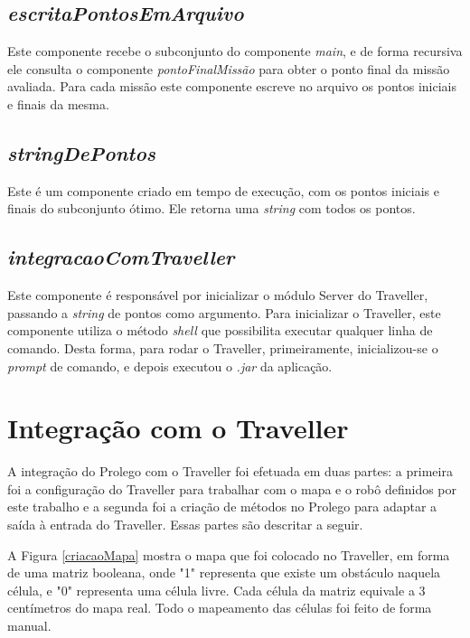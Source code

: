 \subsection{\textit{escritaPontosEmArquivo}}
	Este componente recebe o subconjunto do componente \textit{main}, e de forma recursiva ele consulta o componente \textit{pontoFinalMissão} para obter o ponto final da missão avaliada. Para cada missão este componente escreve no arquivo os pontos iniciais e finais da mesma.

\subsection{\textit{stringDePontos}}
	Este é um componente criado em tempo de execução, com os pontos iniciais e finais do subconjunto ótimo. Ele retorna uma \textit{string} com todos os pontos.
	
\subsection{\textit{integracaoComTraveller}}
	Este componente é responsável por inicializar o módulo Server do Traveller, passando a \textit{string} de pontos como argumento. Para inicializar o Traveller, este componente utiliza o método \textit{shell} que possibilita executar qualquer linha de comando. Desta forma, para rodar o Traveller, primeiramente, inicializou-se o \textit{prompt} de comando, e depois executou o \textit{.jar} da aplicação.

\section{Integração com o Traveller}
	A integração do Prolego com o Traveller foi efetuada em duas partes: a primeira foi a configuração do Traveller para trabalhar com o mapa e o robô definidos por este trabalho e a segunda foi a criação de métodos no Prolego para adaptar a saída à entrada do Traveller. Essas partes são descritar a seguir.
	
	A Figura \ref{criacaoMapa} mostra o mapa que foi colocado no Traveller, em forma de uma matriz booleana, onde  "1" representa que existe um obstáculo naquela célula, e "0" representa uma célula livre. Cada célula da matriz equivale a 3 centímetros do mapa real. Todo o mapeamento das células foi feito de forma manual.

